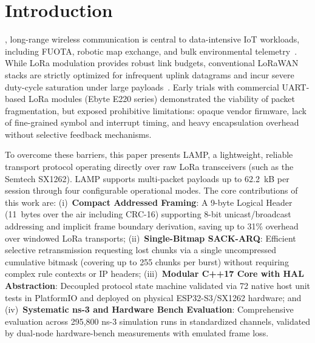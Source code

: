 \documentclass[journal]{IEEEtran}
\begin{document}
\section{Introduction}
% 
% 
% 
% 
, long-range wireless communication is central to data-intensive \ac{IoT} workloads, including \ac{FUOTA}, robotic map exchange, and bulk environmental telemetry~\cite{10807074, multimedia-lora-survey, dare-lorawan}. While \ac{LoRa} modulation provides robust link budgets, conventional \ac{LoRaWAN} stacks are strictly optimized for infrequent uplink datagrams and incur severe duty-cycle saturation under large payloads~\cite{croce2020demystified, etsi300220}. Early trials with commercial UART-based LoRa modules (Ebyte E220 series) demonstrated the viability of packet fragmentation, but exposed prohibitive limitations: opaque vendor firmware, lack of fine-grained symbol and interrupt timing, and heavy encapsulation overhead without selective feedback mechanisms.

To overcome these barriers, this paper presents \ac{LAMP}, a lightweight, reliable transport protocol operating directly over raw \ac{LoRa} transceivers (such as the Semtech SX1262). LAMP supports multi-packet payloads up to 62.2~kB per session through four configurable operational modes. The core contributions of this work are: (i)~\textbf{Compact Addressed Framing}: A 9-byte Logical Header (11~bytes over the air including CRC-16) supporting 8-bit unicast/broadcast addressing and implicit frame boundary derivation, saving up to 31\% overhead over windowed LoRa transports; (ii)~\textbf{Single-Bitmap SACK-ARQ}: Efficient selective retransmission requesting lost chunks via a single uncompressed cumulative bitmask (covering up to 255 chunks per burst) without requiring complex rule contexts or IP headers; (iii)~\textbf{Modular C++17 Core with HAL Abstraction}: Decoupled protocol state machine validated via 72 native host unit tests in PlatformIO and deployed on physical ESP32-S3/SX1262 hardware; and (iv)~\textbf{Systematic ns-3 and Hardware Bench Evaluation}: Comprehensive evaluation across 295,800 ns-3 simulation runs in standardized channels, validated by dual-node hardware-bench measurements with emulated frame loss.
\end{document}
